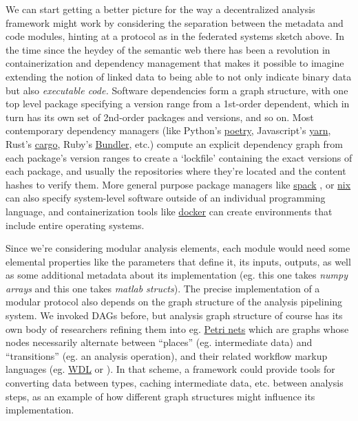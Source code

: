 We can start getting a better picture for the way a decentralized
analysis framework might work by considering the separation between the
metadata and code modules, hinting at a protocol as in the federated
systems sketch above. In the time since the heydey of the semantic web
there has been a revolution in containerization and dependency
management that makes it possible to imagine extending the notion of
linked data to being able to not only indicate binary data but also
\emph{executable code.} Software dependencies form a graph structure,
with one top level package specifying a version range from a 1st-order
dependent, which in turn has its own set of 2nd-order packages and
versions, and so on. Most contemporary dependency managers (like
Python's \href{https://python-poetry.org/}{poetry}, Javascript's
\href{https://yarnpkg.com/}{yarn}, Rust's
\href{https://doc.rust-lang.org/cargo/}{cargo}, Ruby's
\href{https://bundler.io/}{Bundler}, etc.) compute an explicit
dependency graph from each package's version ranges to create a
`lockfile' containing the exact versions of each package, and usually
the repositories where they're located and the content hashes to verify
them. More general purpose package managers like
\href{https://spack.readthedocs.io/en/latest/}{spack} \citep{gamblinSpackPackageManager2015} , or \href{https://nixos.org/}{nix}
\citep{dolstraNixSafePolicyFree2004}  can also specify
system-level software outside of an individual programming language, and
containerization tools like \href{https://www.docker.com/}{docker} can
create environments that include entire operating systems.

Since we're considering modular analysis elements, each module would
need some elemental properties like the parameters that define it, its
inputs, outputs, as well as some additional metadata about its
implementation (eg. this one takes \emph{numpy arrays} and this one
takes \emph{matlab structs}). The precise implementation of a modular
protocol also depends on the graph structure of the analysis pipelining
system. We invoked DAGs before, but analysis graph structure of course
has its own body of researchers refining them into eg.
\href{https://en.wikipedia.org/wiki/Petri_net}{Petri nets} which are
graphs whose nodes necessarily alternate between ``places'' (eg.
intermediate data) and ``transitions'' (eg. an analysis operation), and
their related workflow markup languages (eg.
\href{https://openwdl.org/}{WDL} or \citep{vanderaalstYAWLAnotherWorkflow2005} ). In that scheme, a framework
could provide tools for converting data between types, caching
intermediate data, etc. between analysis steps, as an example of how
different graph structures might influence its implementation.

